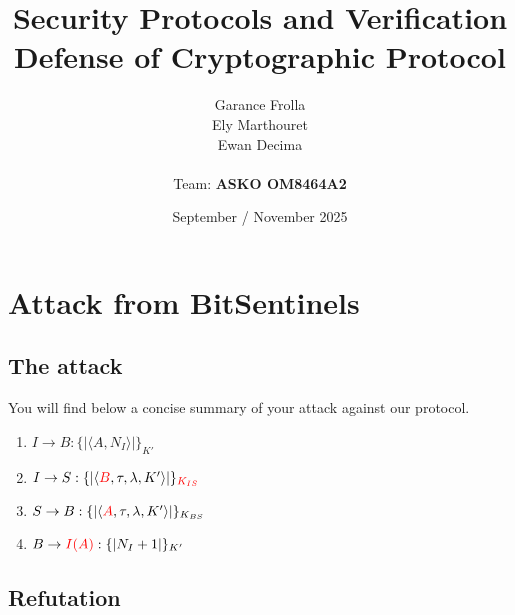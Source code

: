 \documentclass[11pt]{article}
\begin{document}
    \title{
            { \textbf{Security Protocols and Verification}} \\[1ex]
        {\small Defense of Cryptographic Protocol}
    }


    \author{
        Garance Frolla \\
        Ely Marthouret \\
        Ewan Decima\\ \\
        Team: \textbf{ASKO OM8464A2}
    }

    \date{September / November 2025}


    \maketitle
    \tableofcontents
    \newpage

    \section{Attack from BitSentinels}

    \subsection{The attack}
    You will find below a concise summary of your attack against our protocol.

    \begin{enumerate}
        \item $I \rightarrow B: \{|\langle A, N_I \rangle |\}_{K'}$
        \item $I \rightarrow S: \{|\langle \textcolor{red}{B}, \tau, \lambda, K' \rangle |\}_{\textcolor{red}{K_{IS}}}$
        \item $S \rightarrow B: \{|\langle \textcolor{red}{A}, \tau, \lambda, K' \rangle|\}_{K_{BS}}$
        \item $B \rightarrow \textcolor{red}{I(A)}: \{| N_I +1 |\}_{K'}$
    \end{enumerate}
    \subsection{Refutation}
\end{document}
